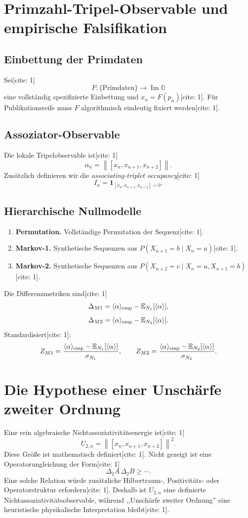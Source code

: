 \documentclass[11pt,a4paper]{article}
\newcommand{\OO}{\mathbb{O}}
\newcommand{\norm}[1]{\left\lVert #1 \right\rVert}
\begin{document}
\section{Primzahl-Tripel-Observable und empirische Falsifikation}
\subsection{Einbettung der Primdaten}
Sei[cite: 1]
\[
F:\{\text{Primdaten}\}\to\operatorname{Im}\OO
\]
eine vollständig spezifizierte Einbettung und $x_n=F(p_n)$[cite: 1]. Für Publikationsreife muss $F$ algorithmisch eindeutig fixiert werden[cite: 1].

\subsection{Assoziator-Observable}
Die lokale Tripelobservable ist[cite: 1]
\[
\boxed{\alpha_n=\norm{[x_n,x_{n+1},x_{n+2}]}.}
\]
Zusätzlich definieren wir die \emph{associating-triplet occupancy}[cite: 1]
\[
I_n=\mathbf 1_{[x_n,x_{n+1},x_{n+2}]=0}.
\]

\subsection{Hierarchische Nullmodelle}
\begin{enumerate}[label=\textbf{$N_{\arabic*}$:},start=0]
\item \textbf{Permutation.} Vollständige Permutation der Sequenz[cite: 1].
\item \textbf{Markov-1.} Synthetische Sequenzen aus $P(X_{n+1}=b\mid X_n=a)$[cite: 1].
\item \textbf{Markov-2.} Synthetische Sequenzen aus $P(X_{n+2}=c\mid X_n=a,X_{n+1}=b)$[cite: 1].
\end{enumerate}
Die Differenzmetriken sind[cite: 1]
\[
\Delta_{M1}=\langle\alpha\rangle_{\rm emp}-\mathbb E_{N_1}[\langle\alpha\rangle],
\]
\[
\Delta_{M2}=\langle\alpha\rangle_{\rm emp}-\mathbb E_{N_2}[\langle\alpha\rangle].
\]
Standardisiert[cite: 1]:
\[
Z_{M1}=\frac{\langle\alpha\rangle_{\rm emp}-\mathbb E_{N_1}[\langle\alpha\rangle]}{\sigma_{N_1}},\qquad
Z_{M2}=\frac{\langle\alpha\rangle_{\rm emp}-\mathbb E_{N_2}[\langle\alpha\rangle]}{\sigma_{N_2}}.
\]

\section{Die Hypothese einer Unschärfe zweiter Ordnung}
Eine rein algebraische Nichtassoziativitätsenergie ist[cite: 1]
\[
\boxed{U_{2,n}=\norm{[x_n,x_{n+1},x_{n+2}]}^2.}
\]
Diese Größe ist mathematisch definiert[cite: 1]. Nicht gezeigt ist eine Operatorungleichung der Form[cite: 1]
\[
\Delta_2A\,\Delta_2B\ge\cdots.
\]
Eine solche Relation würde zusätzliche Hilbertraum-, Positivitäts- oder Operatorstruktur erfordern[cite: 1]. Deshalb ist $U_{2,n}$ eine definierte Nichtassoziativitätsobservable, während ,,Unschärfe zweiter Ordnung'' eine heuristische physikalische Interpretation bleibt[cite: 1].
\end{document}
